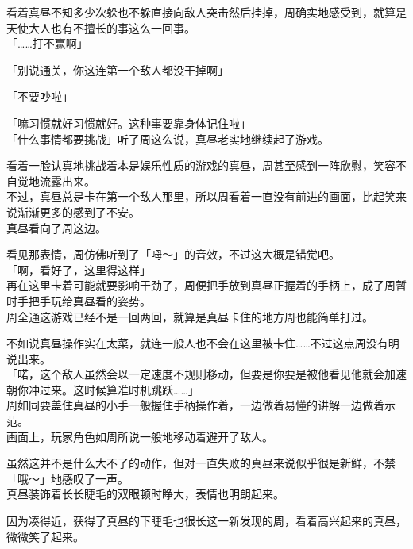 看着真昼不知多少次躲也不躲直接向敌人突击然后挂掉，周确实地感受到，就算是天使大人也有不擅长的事这么一回事。\\

「……打不赢啊」

「别说通关，你这连第一个敌人都没干掉啊」

「不要吵啦」

「嘛习惯就好习惯就好。这种事要靠身体记住啦」\\

「什么事情都要挑战」听了周这么说，真昼老实地继续起了游戏。

看着一脸认真地挑战着本是娱乐性质的游戏的真昼，周甚至感到一阵欣慰，笑容不自觉地流露出来。\\

不过，真昼总是卡在第一个敌人那里，所以周看着一直没有前进的画面，比起笑来说渐渐更多的感到了不安。\\

真昼看向了周这边。

看见那表情，周仿佛听到了「呣～」的音效，不过这大概是错觉吧。\\

「啊，看好了，这里得这样」\\

再在这里卡着可能就要影响干劲了，周便把手放到真昼正握着的手柄上，成了周暂时手把手玩给真昼看的姿势。\\

周全通这游戏已经不是一回两回，就算是真昼卡住的地方周也能简单打过。

不如说真昼操作实在太菜，就连一般人也不会在这里被卡住……不过这点周没有明说出来。\\

「喏，这个敌人虽然会以一定速度不规则移动，但要是你要是被他看见他就会加速朝你冲过来。这时候算准时机跳跃……」\\

周如同要盖住真昼的小手一般握住手柄操作着，一边做着易懂的讲解一边做着示范。\\

画面上，玩家角色如周所说一般地移动着避开了敌人。

虽然这并不是什么大不了的动作，但对一直失败的真昼来说似乎很是新鲜，不禁「哦～」地感叹了一声。\\

真昼装饰着长长睫毛的双眼顿时睁大，表情也明朗起来。

因为凑得近，获得了真昼的下睫毛也很长这一新发现的周，看着高兴起来的真昼，微微笑了起来。\\

